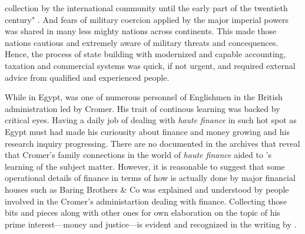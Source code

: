 collection by the international community until the early part of the twentieth century" \citep[p.~107]{queralt2022}. And fears of military coercion applied by the major imperial powers was shared in many less mighty nations across continents. This made those nations cautious and extremely aware of military threats and concequences. Hence, the process of state building with modernized and capable accounting, taxation and commercial systems was quick, if not urgent, and required external advice from qualified and experienced people. 

While in Egypt, \citeauthor{innes1913} was one of numerous personnel of Englishmen in the British administration led by Cromer. His trait of continous learning was backed by critical eyes. Having a daily job of dealing with \textit{haute finance} in such hot spot as Egypt must had made his curiousity about finance and money growing and his research inquiry progressing. There are no documented in the archives that reveal that Cromer's family connections in the world of \textit{haute finance} aided to \citeauthor{innes1913}'s learning of the subject matter. However, it is reasonable to suggest that some operational details of finance in terms of how is actually done by major financial houses such as Baring Brothers \& Co was explained and understood by people involved in the Cromer's administartion dealing with finance. Collecting those bits and pieces along with other ones for own elaboration on the topic of his prime interest---money and justice---is evident and recognized in the writing by \citeauthor{innes1913}.

